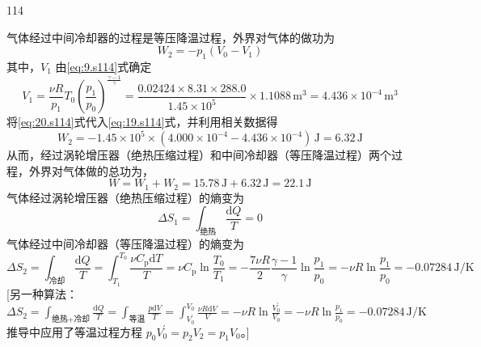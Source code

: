 \begin{solution}{114}
\begin{subsolution}
        气体经过中间冷却器的过程是等压降温过程，外界对气体的做功为
        \begin{equation}
            W_{2} = - p_{1} (V_{0} - V_{1})
            \label{eq:19.s114}
        \end{equation}
        其中，$V_{1}$ 由\eqref{eq:9.s114}式确定
        \begin{equation}
            V_{1} = \frac{\nu R}{p_{1}} T_{0} \left(\frac{p_{1}}{p_{0}}\right)^{\frac{\gamma - 1}{\gamma}} = \frac{0.02424 \times 8.31 \times 288.0}{1.45 \times 10^{5}} \times 1.1088 \,\mathrm{m^{3}} = 4.436 \times 10^{-4} \,\mathrm{m^{3}}
            \label{eq:20.s114}
        \end{equation}
        将\eqref{eq:20.s114}式代入\eqref{eq:19.s114}式，并利用相关数据得
        \begin{equation}
            W_{2} = - 1.45 \times 10^{5} \times (4.000 \times 10^{-4} - 4.436 \times 10^{-4}) \,\mathrm{J} = 6.32 \,\mathrm{J}
            \label{eq:21.s114}
        \end{equation}
        从而，经过涡轮增压器（绝热压缩过程）和中间冷却器（等压降温过程）两个过程，外界对气体做的总功为，
        \begin{equation}
            W = W_{1} + W_{2} = 15.78 \,\mathrm{J} + 6.32 \,\mathrm{J} = 22.1 \,\mathrm{J}
            \label{eq:22.s114}
        \end{equation}
        气体经过涡轮增压器（绝热压缩过程）的熵变为
        \begin{equation}
            \Delta S_{1} = \int_{\text{绝热}} \frac{\mathrm{d} Q}{T} = 0
            \label{eq:23.s114}
        \end{equation}
        气体经过中间冷却器（等压降温过程）的熵变为
        \begin{equation}
            \Delta S_{2} = \int_{\text{冷却}} \frac{\mathrm{d} Q}{T} = \int_{T_{1}}^{T_{0}} \frac{\nu C_{\mathrm{p}} \mathrm{d} T}{T} = \nu C_{\mathrm{p}} \ln \frac{T_{0}}{T_{1}} = - \frac{7 \nu R}{2} \frac{\gamma - 1}{\gamma} \ln \frac{p_{1}}{p_{0}} = - \nu R \ln \frac{p_{1}}{p_{0}} = - 0.07284 \,\mathrm{J/K}
            \label{eq:24.s114}
        \end{equation}
        [另一种算法：
        $\Delta S_{2} = \int_{\text{绝热} + \text{冷却}} \frac{\mathrm{d} Q}{T} = \int_{\text{等温}} \frac{p \mathrm{d} V}{T} = \int_{V_{0}^{\prime}}^{V_{0}} \frac{\nu R \mathrm{d} V}{V} = - \nu R \ln \frac{V_{0}^{\prime}}{V_{0}} = - \nu R \ln \frac{p_{1}}{p_{0}} = - 0.07284 \,\mathrm{J/K}$
        推导中应用了等温过程方程 $p_{0}V_{0}^{\prime} = p_{2}V_{2} = p_{1}V_{0}$。]
    \end{subsolution}
\end{solution}